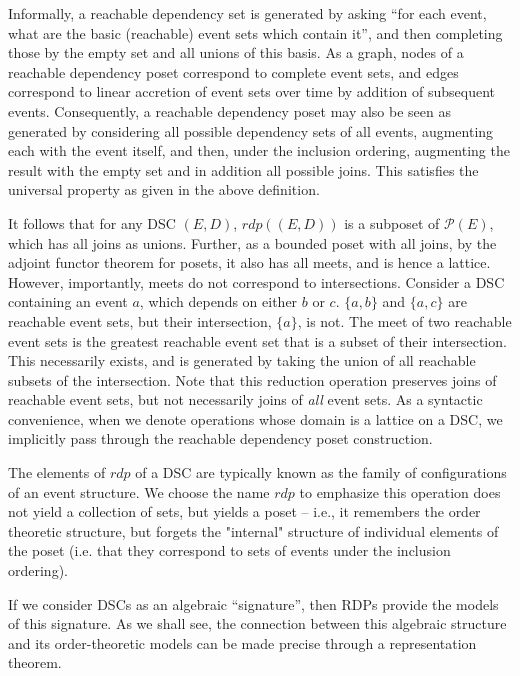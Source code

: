 \documentclass[a4paper,USenglish,cleveref, autoref, thm-restate,authorcolumns]{lipics-v2019}
\newcommand{\Pc}{\mathcal{P}}
\begin{document}
Informally, a reachable dependency set is generated by asking ``for each event, what are the basic (reachable) event sets which contain it'', and then completing those by the empty set and all unions of this basis.  As a graph, nodes of a reachable dependency poset correspond to complete event sets, and edges correspond to linear accretion of event sets over time by addition of subsequent events. Consequently, a reachable dependency poset may also be seen as generated by considering all possible dependency sets of all events, augmenting each with the event itself, and then, under the inclusion ordering, augmenting the result with the empty set and in addition all possible joins. This satisfies the universal property as given in the above definition.

It follows that for any DSC \((E,D)\), \(rdp((E,D))\)  is a subposet of \(\Pc(E)\), which has all joins as unions. Further, as a bounded poset with all joins, by the adjoint functor theorem for posets, it also has all  meets, and is hence a lattice. However, importantly, meets do not correspond to intersections. Consider a DSC containing an event \(a\), which depends on either \(b\) or \(c\). \(\{a,b\}\) and  \(\{a,c\}\) are reachable event sets, but their intersection, \(\{a\}\), is not. The meet of two reachable event sets is the greatest reachable event set that is a subset of their intersection. This necessarily exists, and is generated by taking the union of all reachable subsets of the intersection. Note that this reduction operation preserves joins of reachable event sets, but not necessarily joins of \textit{all} event sets. As a syntactic convenience, when we denote operations whose domain is a lattice on a DSC, we implicitly pass through the reachable dependency poset construction.

The elements of \(rdp\) of a DSC are typically known as the family of configurations of an event structure. We choose the name \(rdp\) to emphasize this operation does not yield a collection of sets, but yields a poset -- i.e., it remembers the order theoretic structure, but forgets the "internal" structure of individual elements of the poset (i.e. that they correspond to sets of events under the inclusion ordering).

If we consider DSCs as an algebraic ``signature'', then RDPs provide the models of this signature. As we shall see, the connection between this algebraic structure and its order-theoretic models can be made precise through a representation theorem.
\end{document}
